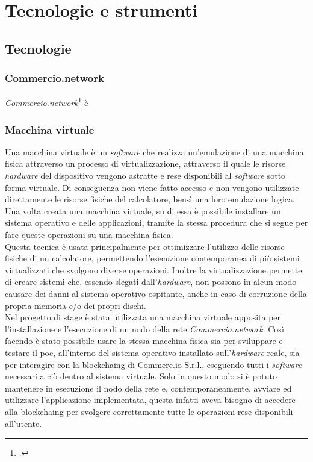 
\chapter{Tecnologie e strumenti}
\label{cap:tecnologie-strumenti}

\section{Tecnologie}
\subsection*{Commercio.network}

\textit{Commercio.network}\footcite{site:commercio-network} è

\subsection*{Macchina virtuale}

Una macchina virtuale è un \textit{software} che realizza un'emulazione di una macchina fisica attraverso un processo di virtualizzazione, attraverso il quale le risorse \textit{hardware} del dispositivo vengono astratte e rese disponibili al \textit{software} sotto forma virtuale. Di conseguenza non viene fatto accesso e non vengono utilizzate direttamente le risorse fisiche del calcolatore, bensì una loro emulazione logica. Una volta creata una macchina virtuale, su di essa è possibile installare un sistema operativo e delle applicazioni, tramite la stessa procedura che si segue per fare queste operazioni su una macchina fisica.\\
Questa tecnica è usata principalmente per ottimizzare l'utilizzo delle risorse fisiche di un calcolatore, permettendo l'esecuzione contemporanea di più sistemi virtualizzati che svolgono diverse operazioni. Inoltre la virtualizzazione permette di creare sistemi che, essendo slegati dall'\textit{hardware}, non possono in alcun modo causare dei danni al sistema operativo ospitante, anche in caso di corruzione della propria memoria e/o dei propri dischi.\\
Nel progetto di stage è stata utilizzata una macchina virtuale apposita per l'installazione e l'esecuzione di un nodo della rete \textit{Commercio.network}. Così facendo è stato possibile usare la stessa macchina fisica sia per sviluppare e testare il \gls{poc}, all'interno del sistema operativo installato sull'\textit{hardware} reale, sia per interagire con la \gls{blockchaing} di Commerc.io S.r.l., eseguendo tutti i \textit{software} necessari a ciò dentro al sistema virtuale. Solo in questo modo si è potuto mantenere in esecuzione il nodo della rete e, contemporaneamente, avviare ed utilizzare l'applicazione implementata, questa infatti aveva bisogno di accedere alla \gls{blockchaing} per svolgere correttamente tutte le operazioni rese disponibili all'utente.

